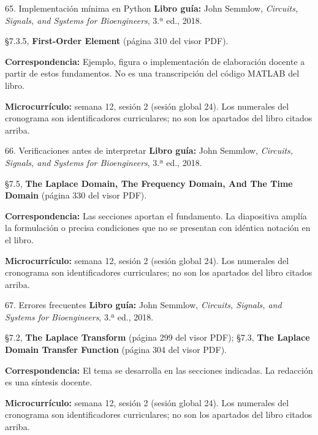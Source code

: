 \documentclass[
  10pt,
  ignorenonframetext,
  aspectratio=169,
  spanish,
]{beamer}
\begin{document}
\begin{frame}{65. Implementación mínima en Python}
\label{implementaciuxf3n-muxednima-en-python-3}
\textbf{Libro guía:} John Semmlow, \emph{Circuits, Signals, and Systems
for Bioengineers}, 3.ª ed., 2018.

§7.3.5, \textbf{First-Order Element} (página 310 del visor PDF).

\textbf{Correspondencia:} Ejemplo, figura o implementación de
elaboración docente a partir de estos fundamentos. No es una
transcripción del código MATLAB del libro.

\textbf{Microcurrículo:} semana 12, sesión 2 (sesión global 24). Los
numerales del cronograma son identificadores curriculares; no son los
apartados del libro citados arriba.
\end{frame}

\begin{frame}{66. Verificaciones antes de interpretar}
\label{verificaciones-antes-de-interpretar-3}
\textbf{Libro guía:} John Semmlow, \emph{Circuits, Signals, and Systems
for Bioengineers}, 3.ª ed., 2018.

§7.5, \textbf{The Laplace Domain, The Frequency Domain, And The Time
Domain} (página 330 del visor PDF).

\textbf{Correspondencia:} Las secciones aportan el fundamento. La
diapositiva amplía la formulación o precisa condiciones que no se
presentan con idéntica notación en el libro.

\textbf{Microcurrículo:} semana 12, sesión 2 (sesión global 24). Los
numerales del cronograma son identificadores curriculares; no son los
apartados del libro citados arriba.
\end{frame}

\begin{frame}{67. Errores frecuentes}
\label{errores-frecuentes-3}
\textbf{Libro guía:} John Semmlow, \emph{Circuits, Signals, and Systems
for Bioengineers}, 3.ª ed., 2018.

§7.2, \textbf{The Laplace Transform} (página 299 del visor PDF); §7.3,
\textbf{The Laplace Domain Transfer Function} (página 304 del visor
PDF).

\textbf{Correspondencia:} El tema se desarrolla en las secciones
indicadas. La redacción es una síntesis docente.

\textbf{Microcurrículo:} semana 12, sesión 2 (sesión global 24). Los
numerales del cronograma son identificadores curriculares; no son los
apartados del libro citados arriba.
\end{frame}
\end{document}
